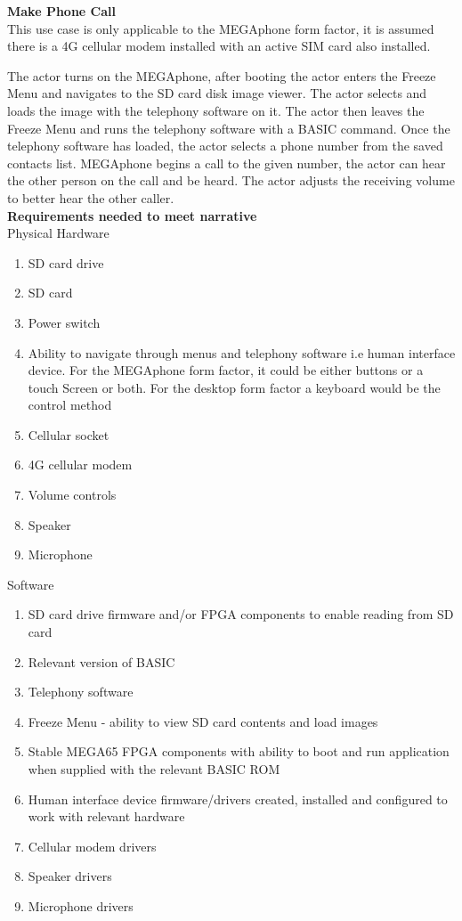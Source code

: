 \textbf{Make Phone Call}\\
This use case is only applicable to the MEGAphone form factor, it is assumed there is a 4G cellular modem installed with an active SIM card also installed.

The actor turns on the MEGAphone, after booting the actor enters the Freeze Menu and navigates to the SD card disk image viewer. The actor selects and loads the image with the telephony software on it. The actor then leaves the Freeze Menu and runs the telephony software with a BASIC command. Once the telephony software has loaded, the actor selects a phone number from the saved contacts list. MEGAphone begins a call to the given number, the actor can hear the other person on the call and be heard. The actor adjusts the receiving volume to better hear the other caller.\\

\textbf{Requirements needed to meet narrative}\\
Physical Hardware
\begin{enumerate}
\item SD card drive
\item SD card
\item Power switch
\item Ability to navigate through menus and telephony software i.e human interface device. For the MEGAphone form factor, it could be either buttons or a touch Screen or both. For the desktop form factor a keyboard would be the control method
\item Cellular socket
\item 4G cellular modem
\item Volume controls
\item Speaker
\item Microphone
\end{enumerate}

Software\\
\begin{enumerate}
\item SD card drive firmware and/or FPGA components to enable reading from SD card
\item Relevant version of BASIC 
\item Telephony software
\item Freeze Menu - ability to view SD card contents and load images
\item Stable MEGA65 FPGA components with ability to boot and run application when supplied with the relevant BASIC ROM
\item Human interface device firmware/drivers created, installed and configured to work with relevant hardware
\item Cellular modem drivers
\item Speaker drivers
\item Microphone drivers
\end{enumerate}

